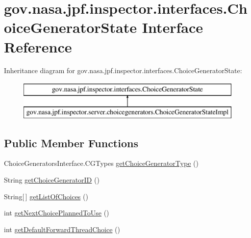\hypertarget{interfacegov_1_1nasa_1_1jpf_1_1inspector_1_1interfaces_1_1_choice_generator_state}{}\section{gov.\+nasa.\+jpf.\+inspector.\+interfaces.\+Choice\+Generator\+State Interface Reference}
\label{interfacegov_1_1nasa_1_1jpf_1_1inspector_1_1interfaces_1_1_choice_generator_state}
Inheritance diagram for gov.\+nasa.\+jpf.\+inspector.\+interfaces.\+Choice\+Generator\+State\+:\begin{figure}[H]
\begin{center}
\leavevmode
\includegraphics[height=2.000000cm]{interfacegov_1_1nasa_1_1jpf_1_1inspector_1_1interfaces_1_1_choice_generator_state}
\end{center}
\end{figure}
\subsection*{Public Member Functions}
\begin{DoxyCompactItemize}
\item 
Choice\+Generators\+Interface.\+C\+G\+Types \hyperlink{interfacegov_1_1nasa_1_1jpf_1_1inspector_1_1interfaces_1_1_choice_generator_state_a03a69ca41b23620b58565c0f04777bc0}{get\+Choice\+Generator\+Type} ()
\item 
String \hyperlink{interfacegov_1_1nasa_1_1jpf_1_1inspector_1_1interfaces_1_1_choice_generator_state_a0481520596cf88ca01a2c155e9961413}{get\+Choice\+Generator\+ID} ()
\item 
String\mbox{[}$\,$\mbox{]} \hyperlink{interfacegov_1_1nasa_1_1jpf_1_1inspector_1_1interfaces_1_1_choice_generator_state_afacd541c2c0052973bb2972bea5ff5ef}{get\+List\+Of\+Choices} ()
\item 
int \hyperlink{interfacegov_1_1nasa_1_1jpf_1_1inspector_1_1interfaces_1_1_choice_generator_state_af6cfbb9fe525ee0c5eeb37299d1eedb6}{get\+Next\+Choice\+Planned\+To\+Use} ()
\item 
int \hyperlink{interfacegov_1_1nasa_1_1jpf_1_1inspector_1_1interfaces_1_1_choice_generator_state_a9d20c79a74a99b035905e9eab37602ed}{get\+Default\+Forward\+Thread\+Choice} ()
\end{DoxyCompactItemize}



